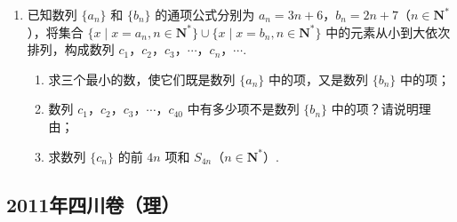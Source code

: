 \begin{description}
\begin{enumerate}[leftmargin=5pt]
        \item 已知数列 \(\{a_{n}\}\) 和 \(\{b_{n}\}\) 的通项公式分别为 \(a_{n} = 3n + 6\)，\(b_{n} = 2n + 7\)（\(n \in \mathbf{N}^{*}\)），将集合 \(\{x \mid x = a_{n}, n \in \mathbf{N}^{*}\} \cup \{x \mid x = b_{n}, n \in \mathbf{N}^{*}\}\) 中的元素从小到大依次排列，构成数列 \(c_{1}\)，\(c_{2}\)，\(c_{3}\)，\(\cdots\)，\(c_{n}\)，\(\cdots\).
\begin{enumerate}
\item 求三个最小的数，使它们既是数列 \(\{a_{n}\}\) 中的项，又是数列 \(\{b_{n}\}\) 中的项；
\item 数列 \(c_{1}\)，\(c_{2}\)，\(c_{3}\)，\(\cdots\)，\(c_{40}\) 中有多少项不是数列 \(\{b_{n}\}\) 中的项？请说明理由；
\item 求数列 \(\{c_{n}\}\) 的前 \(4n\) 项和 \(S_{4n}\)（\(n \in \mathbf{N}^{*}\)）.
\end{enumerate}

    \end{enumerate}

\end{description}


\subsection{2011年四川卷（理）}\label{gk:2011年四川卷（理）}

